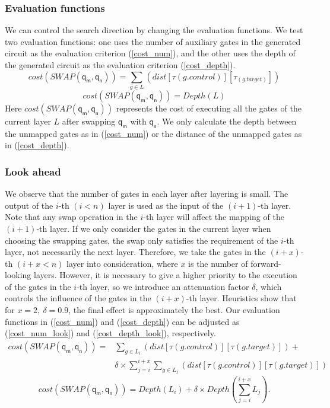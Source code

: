 \documentclass[runningheads]{llncs}
\begin{document}
\subsubsection{Evaluation functions }
We can control the search direction by changing the evaluation functions.
We test two evaluation functions: one uses the number of auxiliary gates in the generated circuit as the evaluation criterion (\ref{cost_num}),  and the other uses the depth of the generated circuit as the evaluation criterion  (\ref{cost_depth}).
\begin{equation}
	cost(SWAP(\textsf{q}_\textsf{m},\textsf{q}_\textsf{n}))= \sum_{g \in L}(dist[\tau(g.control)][\tau_(g.target)])
	\label{cost_num}
\end{equation}
	\begin{equation}
		cost(SWAP(\textsf{q}_\textsf{m},\textsf{q}_\textsf{n}))= Depth(L)
		\label{cost_depth}
		\end{equation}
Here $cost(SWAP(\textsf{q}_\textsf{m},\textsf{q}_\textsf{n}))$ represents the cost of executing all the gates of the current layer $L$ 
after swapping $\textsf{q}_\textsf{m}$ with $\textsf{q}_\textsf{n}$. We only calculate the depth between the unmapped gates as in (\ref{cost_num}) or the distance of the unmapped gates as in (\ref{cost_depth}).

\subsubsection{Look ahead }
We observe that the number of gates in each layer after layering is small. The output of the $i$-th $(i<n)$ layer is used as the input of the $(i+1)$-th layer. Note that any swap operation in the $i$-th layer will affect the mapping of the $(i+1)$-th layer. If we only consider the gates in the current layer when choosing the swapping gates, the swap only satisfies the requirement of the $i$-th layer, not necessarily the next layer. Therefore, we take the gates in the $(i+x)$-th $(i+x<n)$ layer into consideration, where $x$ is the number of forward-looking layers. However, it is necessary to give a higher priority to the execution of the gates in the $i$-th layer, so we introduce an attenuation factor $\delta$, which controls the influence of the gates in the $(i+x)$-th layer. Heuristics show that for $x=2,\ \delta=0.9$, the final effect is  approximately the best. Our evaluation functions in (\ref{cost_num}) and  (\ref{cost_depth}) can be adjusted as
(\ref{cost_num_look}) and  (\ref{cost_depth_look}), respectively.
 \begin{equation}
	 	\begin{aligned}
			cost(SWAP(\textsf{q}_\textsf{m},\textsf{q}_\textsf{n}))=&\sum_{g \in L_{i}}(dist[\tau(g.control)][\tau(g.target)])+\\
	&\delta \times \sum_{j=i}^{i+x}\sum_{g \in L_{j}}(dist[\tau(g.control)][\tau(g.target)])
	\label{cost_num_look}
	\end{aligned}
 \end{equation}
	\begin{equation}
		cost(SWAP(\textsf{q}_\textsf{m},\textsf{q}_\textsf{n}))= Depth(L_{i})+\delta \times Depth(\sum_{j=i}^{i+x}L_{j}).
		\label{cost_depth_look}
		\end{equation}
\end{document}
